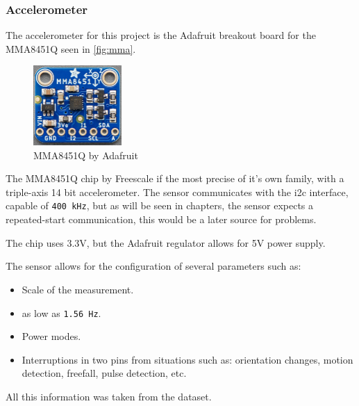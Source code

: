 \subsubsection{Accelerometer}
The accelerometer for this project is the Adafruit breakout board\cite{DownloadsAdafruitMMA8451} for the MMA8451Q\cite{MMA8451Q1a} seen in \autoref{fig:mma}.
\begin{figure}[H]
    \centering
    \includegraphics[width=0.3\textwidth]{images/3/mma.png}
    \caption{MMA8451Q by Adafruit}
    \label{fig:mma}
\end{figure}
The MMA8451Q chip by Freescale if the most precise of it's own family, with a triple-axis 14 bit accelerometer. The sensor communicates with the \acrshort{i2c} interface, capable of \texttt{400 kHz}, but as will be seen 
in chapters, the sensor expects a repeated-start communication, this would be a later source for problems.

The chip uses 3.3V, but the Adafruit regulator allows for 5V power supply.

The sensor allows for the configuration of several parameters such as:
\begin{itemize}
    \item Scale of the measurement.
    \item {} as low as \texttt{1.56 Hz}.
    \item Power modes.
    \item Interruptions in two pins from situations such as: orientation changes, motion detection, freefall, pulse detection, etc.
\end{itemize}
All this information was taken from the dataset\cite{MMA8451Q1a}.


